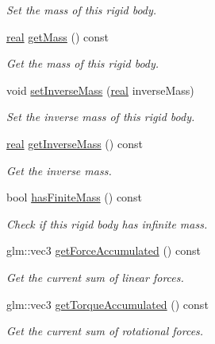 \begin{DoxyCompactItemize}
\begin{DoxyCompactList}\small\item\em Set the mass of this rigid body. \end{DoxyCompactList}\item 
\mbox{\hyperlink{namespacer3_ab2016b3e3f743fb735afce242f0dc1eb}{real}} \mbox{\hyperlink{classr3_1_1_rigid_body_a171ee8190ba1c7c2a40c5faf8d654170}{get\+Mass}} () const
\begin{DoxyCompactList}\small\item\em Get the mass of this rigid body. \end{DoxyCompactList}\item 
void \mbox{\hyperlink{classr3_1_1_rigid_body_a28ee9e1542663a4e704077e9327ddece}{set\+Inverse\+Mass}} (\mbox{\hyperlink{namespacer3_ab2016b3e3f743fb735afce242f0dc1eb}{real}} inverse\+Mass)
\begin{DoxyCompactList}\small\item\em Set the inverse mass of this rigid body. \end{DoxyCompactList}\item 
\mbox{\hyperlink{namespacer3_ab2016b3e3f743fb735afce242f0dc1eb}{real}} \mbox{\hyperlink{classr3_1_1_rigid_body_a9a994b91ccc980c1dcc4ed43f71b6913}{get\+Inverse\+Mass}} () const
\begin{DoxyCompactList}\small\item\em Get the inverse mass. \end{DoxyCompactList}\item 
bool \mbox{\hyperlink{classr3_1_1_rigid_body_a4e2a5b4dd423c75199fb0a4fb2ae078f}{has\+Finite\+Mass}} () const
\begin{DoxyCompactList}\small\item\em Check if this rigid body has infinite mass. \end{DoxyCompactList}\item 
glm\+::vec3 \mbox{\hyperlink{classr3_1_1_rigid_body_ae15bce9cc4aa2db577bdfb61464d26c0}{get\+Force\+Accumulated}} () const
\begin{DoxyCompactList}\small\item\em Get the current sum of linear forces. \end{DoxyCompactList}\item 
glm\+::vec3 \mbox{\hyperlink{classr3_1_1_rigid_body_a8a5111fa2e4bd5f3a2615525da4c2949}{get\+Torque\+Accumulated}} () const
\begin{DoxyCompactList}\small\item\em Get the current sum of rotational forces. \end{DoxyCompactList}\item 

\end{DoxyCompactItemize}
